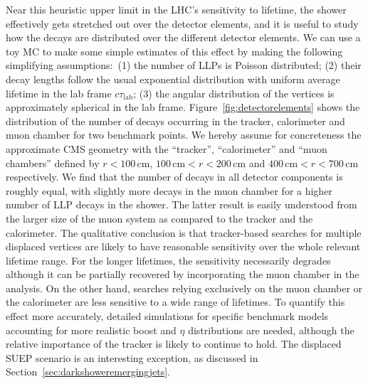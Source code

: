 Near this heuristic upper limit in the LHC's sensitivity to lifetime, the shower effectively gets stretched out over the detector elements, and it is useful to study how the decays are distributed over the different detector elements. We can use a toy MC to make some simple estimates of this effect by making the following simplifying assumptions:~(1) the number of LLPs is Poisson distributed; (2) their decay lengths follow the usual exponential distribution with uniform average lifetime in the lab frame $c\tau_{\text{lab}}$; (3) the angular distribution of the vertices is approximately spherical in the lab frame. Figure~\ref{fig:detectorelements} shows the distribution of the number of decays occurring in the tracker, calorimeter and muon chamber for two benchmark points. We hereby assume for concreteness the approximate CMS geometry with the ``tracker'', ``calorimeter'' and ``muon chambers'' defined by $r<100\, \text{cm}$, $100\, \text{cm}<r<200\, \text{cm}$  and  $400\, \text{cm}<r<700\, \text{cm}$ respectively. We find that the number of decays in all detector components is roughly equal, with slightly more decays in the muon chamber for a higher number of LLP decays in the shower. The latter result is easily understood from the larger size of the muon system as compared to the tracker and the calorimeter. The qualitative conclusion is that tracker-based searches for multiple displaced vertices are likely to have reasonable sensitivity over the whole relevant lifetime range. For the longer lifetimes, the sensitivity necessarily degrades although it can be partially recovered by incorporating the muon chamber in the analysis. On the other hand, searches relying exclusively on the muon chamber or the calorimeter are less sensitive to a wide range of lifetimes. To quantify this effect more accurately, detailed simulations for specific benchmark models accounting for more realistic boost and $\eta$ distributions are needed, although the relative importance of the tracker is likely to continue to hold. The displaced SUEP scenario is an interesting exception, as discussed in Section~\ref{sec:darkshoweremergingjets}.

